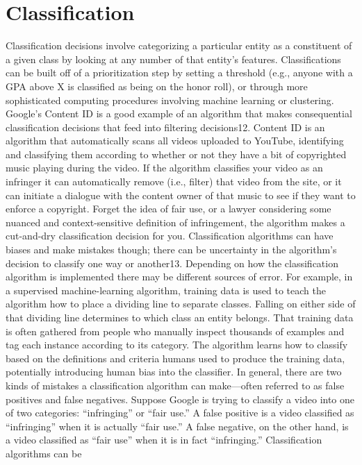 \section{Classification }
Classification decisions involve categorizing a particular entity as a constituent of a given class by looking at any number of that entity's features. Classifications can be built off of a prioritization step by setting a threshold (e.g., anyone with a GPA above X is classified as being on the honor roll), or through more sophisticated computing procedures involving machine learning or clustering. 
Google's Content ID is a good example of an algorithm that makes consequential classification decisions that feed into filtering decisions12. Content ID is an algorithm that automatically scans all videos uploaded to YouTube, identifying and classifying them according to whether or not they have a bit of copyrighted music playing during the video. If the algorithm classifies your video as an infringer it can automatically remove (i.e., filter) that video from the site, or it can initiate a dialogue with the content owner of that music to see if they want to enforce a copyright. Forget the idea of fair use, or a lawyer considering some nuanced and context-sensitive definition of infringement, the algorithm makes a cut-and-dry classification decision for you. 
Classification algorithms can have biases and make mistakes though; there can be uncertainty in the algorithm's decision to classify one way or another13. Depending on how the classification algorithm is implemented there may be different sources of error. For example, in a supervised machine-learning algorithm, training data is used to teach the algorithm how to place a dividing line to separate classes. Falling on either side of that dividing line determines to which class an entity belongs. That training data is often gathered from people who manually inspect thousands of examples and tag each instance according to its category. The algorithm learns how to classify based on the definitions and criteria humans used to produce the training data, potentially introducing human bias into the classifier. 
In general, there are two kinds of mistakes a classification algorithm can make—often referred to as false positives and false negatives. Suppose Google is trying to classify a video into one of two categories: ``infringing'' or ``fair use.'' A false positive is a video classified as ``infringing'' when it is actually ``fair use.'' A false negative, on the other hand, is a video classified as ``fair use'' when it is in fact ``infringing.'' Classification algorithms can be
